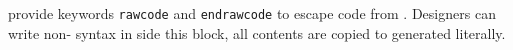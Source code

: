 \mhdl{} provide keywords \texttt{rawcode} and
 \texttt{endrawcode} to escape code from \mhdlc{}.
Designers can write non-\mhdl{} syntax in side this block, 
all contents are copied to generated \sv{} literally.
